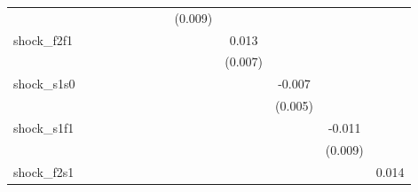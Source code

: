{\begin{tabular}{l*{12}{c}}
            &                     &                     &                     &                     &                     &                     &                     &     (0.009)         &                     &                     &                     &                     \\
\addlinespace
shock\_f2f1  &                     &                     &                     &                     &                     &                     &                     &                     &       0.013\sym{*}  &                     &                     &                     \\
            &                     &                     &                     &                     &                     &                     &                     &                     &     (0.007)         &                     &                     &                     \\
\addlinespace
shock\_s1s0  &                     &                     &                     &                     &                     &                     &                     &                     &                     &      -0.007         &                     &                     \\
            &                     &                     &                     &                     &                     &                     &                     &                     &                     &     (0.005)         &                     &                     \\
\addlinespace
shock\_s1f1  &                     &                     &                     &                     &                     &                     &                     &                     &                     &                     &      -0.011         &                     \\
            &                     &                     &                     &                     &                     &                     &                     &                     &                     &                     &     (0.009)         &                     \\
\addlinespace
shock\_f2s1  &                     &                     &                     &                     &                     &                     &                     &                     &                     &                     &                     &       0.014\sym{*}  \\

\end{tabular}}
